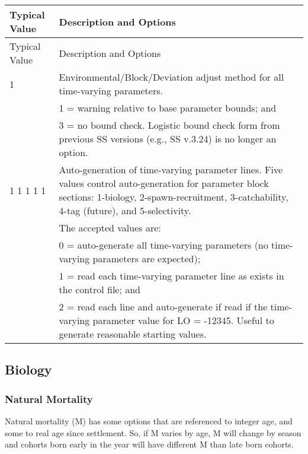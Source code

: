 	
\begin{longtable}{p{0.5cm} p{2cm} p{12cm}}
	\hline
	\multicolumn{2}{l}{Typical Value} & Description and Options\Tstrut\Bstrut\\
	\hline
	\endfirsthead

	\hline
	\multicolumn{2}{l}{Typical Value} & Description and Options\Tstrut\Bstrut\\
	\hline
	\endhead

	\hline
	\endfoot

	\endlastfoot

	1 & & Environmental/Block/Deviation adjust method for all time-varying parameters. \Tstrut\\
	  & & 1 = warning relative to base parameter bounds; and \\
	  & & 3 = no bound check. Logistic bound check form from previous SS versions (e.g., SS v.3.24) is no longer an option.\Bstrut\\

	\multicolumn{2}{l}{1 1 1 1 1} & Auto-generation of time-varying parameter lines. Five values control auto-generation for parameter block sections: 1-biology, 2-spawn-recruitment, 3-catchability, 4-tag (future), and 5-selectivity.\\
	& 			& The accepted values are:\\
	&           & 0 = auto-generate all time-varying parameters (no time-varying parameters are expected);\\
	& 			& 1 = read each time-varying parameter line as exists in the control file; and\\
	&			& 2 = read each line and auto-generate if read if the time-varying parameter value for LO = -12345. Useful to generate reasonable starting values.  \Bstrut\\
	\hline
\end{longtable}


\subsection{Biology}
\subsubsection{Natural Mortality}
Natural mortality (M) has some options that are referenced to integer age, and some to real age since settlement.  So, if M varies by age, M will change by season and cohorts born  early in the year will have different M than late born cohorts.

